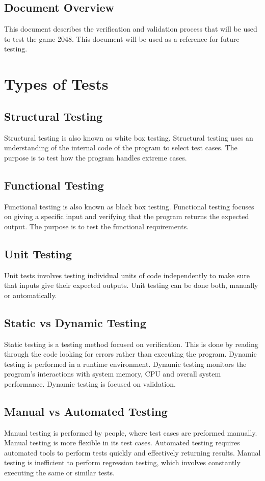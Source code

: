 \documentclass[12pt]{article}
\begin{document}
\subsection{Document Overview}
This document describes the verification and validation process that will be 
used to test the game 2048. This document will be used as a reference for 
future testing.

\section{Types of Tests}

\subsection{Structural Testing}
Structural testing is also known as white box testing. Structural testing 
uses an understanding of the internal code of the program to select test cases. 
The purpose is to test how the program handles extreme cases.

\subsection{Functional Testing}
Functional testing is also known as black box testing. Functional testing 
focuses on giving a specific input and verifying that the program returns the 
expected output. The purpose is to test the functional requirements.

\subsection{Unit Testing}
Unit tests involves testing individual units of code independently to make sure 
that inputs give their expected outputs. Unit testing can be done both,  
manually or automatically.

\subsection{Static vs Dynamic Testing}
Static testing is a testing method focused on verification. This is done by 
reading through the code looking for errors rather than executing the program.
Dynamic testing is performed in a runtime environment. Dynamic testing monitors 
the program's interactions with system memory, CPU and overall system  
performance. Dynamic testing is focused on validation.

\subsection{Manual vs Automated Testing}
Manual testing is performed by people, where test cases are preformed manually. 
Manual testing is more flexible in its test cases. Automated testing 
requires automated tools to perform tests quickly and effectively returning 
results. Manual testing is inefficient to perform regression testing, which 
involves constantly executing the same or similar tests.
\end{document}
